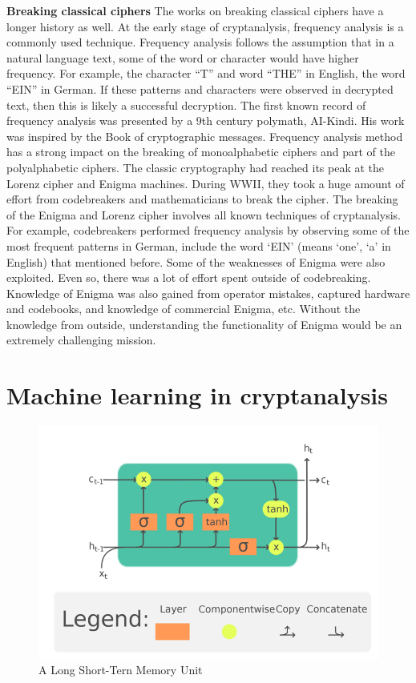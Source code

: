 \noindent\textbf{Breaking classical ciphers	} \qquad	The works on breaking classical ciphers have a longer history as well. At the early stage of cryptanalysis, frequency analysis is a commonly used technique. Frequency analysis follows the assumption that in a natural language text, some of the word or character would have higher frequency. For example, the character “T” and word “THE” in English, the word “EIN” in German. If these patterns and characters were observed in decrypted text, then this is likely a successful decryption. The first known record of frequency analysis was presented by a 9th century polymath, AI-Kindi. His work was inspired by the Book of cryptographic messages. Frequency analysis method has a strong impact on the breaking of monoalphabetic ciphers and part of the polyalphabetic ciphers.
The classic cryptography had reached its peak at the Lorenz cipher and Enigma machines. During WWII, they took a huge amount of effort from codebreakers and mathematicians to break the cipher. The breaking of the Enigma and Lorenz cipher involves all known techniques of cryptanalysis. For example, codebreakers performed frequency analysis by observing some of the most frequent patterns in German, include the word ‘EIN’ (means ‘one’, ‘a’ in English) that mentioned before. Some of the weaknesses of Enigma were also exploited. Even so, there was a lot of effort spent outside of codebreaking. Knowledge of Enigma was also gained from operator mistakes, captured hardware and codebooks, and knowledge of commercial Enigma, etc. Without the knowledge from outside, understanding the functionality of Enigma would be an extremely challenging mission.

\section{Machine learning in cryptanalysis}

\begin{figure}[hbt!]
    \centering
    \includegraphics[width=0.8\linewidth]{figures/LSTM.png}
    \caption{A Long Short-Tern Memory Unit}
    \label{fig:graph}
\end{figure}

